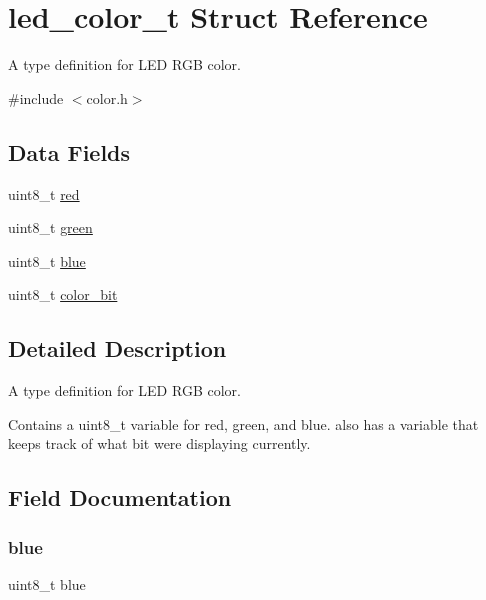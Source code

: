 \hypertarget{structled__color__t}{}\section{led\+\_\+color\+\_\+t Struct Reference}
\label{structled__color__t}


A type definition for L\+ED R\+GB color.  




{\ttfamily \#include $<$color.\+h$>$}

\subsection*{Data Fields}
\begin{DoxyCompactItemize}
\item 
uint8\+\_\+t \hyperlink{structled__color__t_ad47d918910aaa51c73160ac85999d09c}{red}
\item 
uint8\+\_\+t \hyperlink{structled__color__t_a90d21fa503b626c00cdc8d94863d5877}{green}
\item 
uint8\+\_\+t \hyperlink{structled__color__t_a287b397e90d7b995c81ff54e741f96b2}{blue}
\item 
uint8\+\_\+t \hyperlink{structled__color__t_a20303e3baf7a44885164f4a273c8b23d}{color\+\_\+bit}
\end{DoxyCompactItemize}


\subsection{Detailed Description}
A type definition for L\+ED R\+GB color. 

Contains a uint8\+\_\+t variable for red, green, and blue. also has a variable that keeps track of what bit we\textquotesingle{}re displaying currently. 

\subsection{Field Documentation}
\hypertarget{structled__color__t_a287b397e90d7b995c81ff54e741f96b2}{}\label{structled__color__t_a287b397e90d7b995c81ff54e741f96b2} 
\subsubsection{\texorpdfstring{blue}{blue}}
{\footnotesize\ttfamily uint8\+\_\+t blue}

